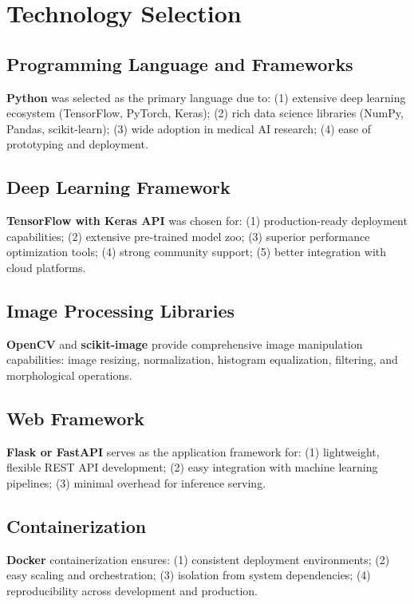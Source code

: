 {\section{Technology Selection}

\subsection{Programming Language and Frameworks}

\textbf{Python} was selected as the primary language due to: (1) extensive deep learning ecosystem (TensorFlow, PyTorch, Keras); (2) rich data science libraries (NumPy, Pandas, scikit-learn); (3) wide adoption in medical AI research; (4) ease of prototyping and deployment.

\subsection{Deep Learning Framework}

\textbf{TensorFlow with Keras API} was chosen for: (1) production-ready deployment capabilities; (2) extensive pre-trained model zoo; (3) superior performance optimization tools; (4) strong community support; (5) better integration with cloud platforms.

\subsection{Image Processing Libraries}

\textbf{OpenCV} and \textbf{scikit-image} provide comprehensive image manipulation capabilities: image resizing, normalization, histogram equalization, filtering, and morphological operations.

\subsection{Web Framework}

\textbf{Flask or FastAPI} serves as the application framework for: (1) lightweight, flexible REST API development; (2) easy integration with machine learning pipelines; (3) minimal overhead for inference serving.

\subsection{Containerization}

\textbf{Docker} containerization ensures: (1) consistent deployment environments; (2) easy scaling and orchestration; (3) isolation from system dependencies; (4) reproducibility across development and production.

}
